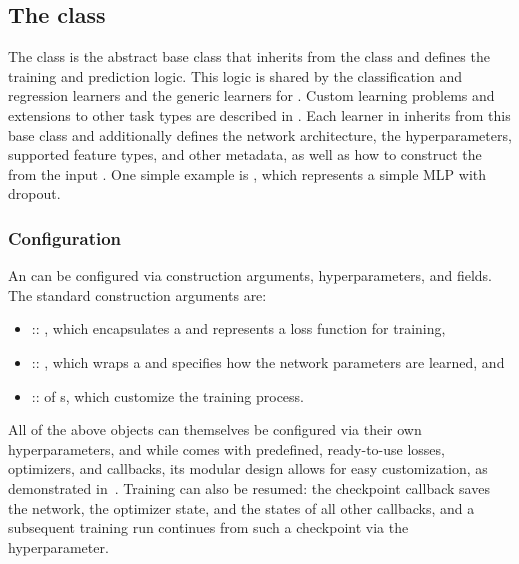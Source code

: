 \documentclass[article,shortnames]{jss}
\theoremstyle{definition}
\begin{document}
\subsection[The LearnerTorch class]{The  class}\label{sec:learner-torch}

The   class is the abstract base class that inherits from the  class and defines the training and prediction logic.
This logic is shared by the classification and regression learners and the generic learners for . Custom learning problems and extensions to other task types are described in .
Each learner in  inherits from this base class and additionally defines the network architecture, the hyperparameters, supported feature types, and other metadata, as well as how to construct the  from the input .
One simple example is , which represents a simple MLP with dropout.

\subsubsection{Configuration}

An \mlrttorch{}  can be configured via construction arguments, hyperparameters, and fields.
The standard construction arguments are:

\begin{itemize}
    \item {} :: , which encapsulates a  and represents a loss function for training,
    \item {} :: , which wraps a  and specifies how the network parameters are learned, and
    \item {} ::  of s, which customize the training process.
\end{itemize}

All of the above objects can themselves be configured via their own hyperparameters, and while  comes with predefined, ready-to-use losses, optimizers, and callbacks, its modular design allows for easy customization, as demonstrated in~.
Training can also be resumed: the checkpoint callback  saves the network, the optimizer state, and the states of all other callbacks, and a subsequent training run continues from such a checkpoint via the  hyperparameter.
\end{document}
